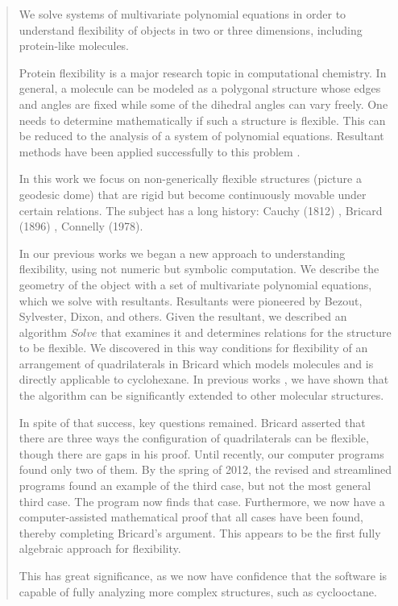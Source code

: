 \documentclass[a4paper]{article} %
\begin{document}
\begin{abstract}
 We solve systems of multivariate polynomial equations in order to
understand flexibility of objects in two or three dimensions, including protein-like molecules.

    Protein flexibility is a major research topic in
computational
chemistry. In general, a molecule can be modeled as 
a polygonal structure whose edges and angles are fixed while some of the
dihedral angles can vary freely.  One needs to determine mathematically if such a structure is flexible. This can be reduced to the analysis of a system of polynomial equations.  Resultant methods have been applied successfully to this 
problem \cite{ cout2}.

In this work we focus on non-generically flexible structures (picture a geodesic dome)
that are rigid but become continuously movable under certain relations. The subject has a long history: 
Cauchy (1812) \cite{cauch}, Bricard (1896) \cite{bric}, Connelly (1978).

In our previous works \cite{LC, aca9} we began
a new approach to understanding flexibility, using not numeric but symbolic computation.
We describe the geometry of the object with a set of
multivariate polynomial equations, which we solve with resultants. Resultants were pioneered by
Bezout, Sylvester, Dixon,
and others.  Given the resultant, we described 
an algorithm $Solve$ that examines it and determines relations for the structure to be
flexible.  We discovered in this way conditions for flexibility
of an  arrangement of quadrilaterals in Bricard \cite{bric} which models molecules and is directly applicable to cyclohexane. 
In previous works \cite{aca9}, we have shown that the algorithm can be significantly extended to other molecular structures.

 In spite of that success, key questions remained.  Bricard asserted that there are three ways the configuration of quadrilaterals can be flexible, though there are gaps in his proof.   Until recently, our computer programs found only two of them.  By the spring of 2012, the revised and streamlined programs found an example of the third case, but not the most general third case.   The program now finds that case.  Furthermore,  we now have a computer-assisted mathematical proof that all cases have been found, thereby completing Bricard's argument.  This appears to be the first fully algebraic approach for flexibility.  
 
   This has great significance, as we now have confidence that the software is capable of fully analyzing more complex structures, such as cyclooctane.  




\end{abstract}
\end{document}
